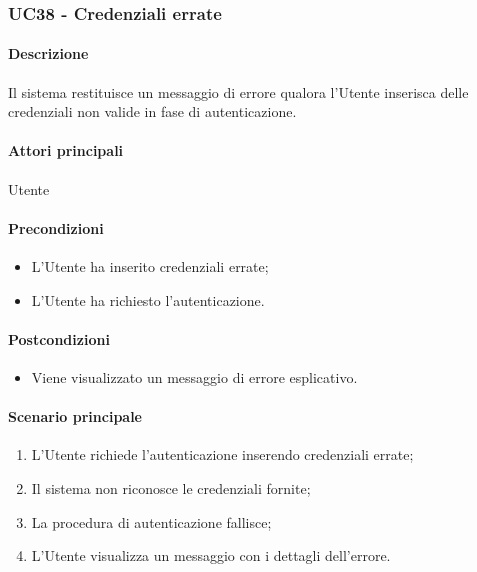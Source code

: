 \subsubsection{UC38 - Credenziali errate}\label{UC38}
\paragraph*{Descrizione}
Il sistema restituisce un messaggio di errore qualora l'Utente inserisca delle credenziali non valide in fase di autenticazione.

\paragraph*{Attori principali}
Utente

\paragraph*{Precondizioni}
\begin{itemize}
  \item L'Utente ha inserito credenziali errate;
  \item L'Utente ha richiesto l'autenticazione. 
\end{itemize}

\paragraph*{Postcondizioni}
\begin{itemize}
  \item Viene visualizzato un messaggio di errore esplicativo.
\end{itemize}

\paragraph*{Scenario principale}
\begin{enumerate}
  \item L'Utente richiede l'autenticazione inserendo credenziali errate; 
  \item Il sistema non riconosce le credenziali fornite;  
  \item La procedura di autenticazione fallisce;
  \item L'Utente visualizza un messaggio con i dettagli dell'errore.
\end{enumerate}